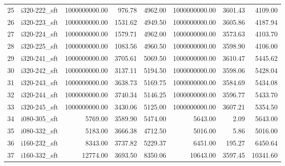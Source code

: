 \begin{tabular}{llrrrrrr}
25 &  i320-222\_sft &         1000000000.00 &                    976.78 &             4962.00 &      1000000000.00 &                3601.43 &          4109.00 \\
26 &  i320-223\_sft &         1000000000.00 &                   1531.62 &             4949.50 &      1000000000.00 &                3605.86 &          4187.94 \\
27 &  i320-224\_sft &         1000000000.00 &                   1579.71 &             4962.00 &      1000000000.00 &                3573.63 &          4103.70 \\
28 &  i320-225\_sft &         1000000000.00 &                   1083.56 &             4960.50 &      1000000000.00 &                3598.90 &          4106.00 \\
29 &  i320-241\_sft &         1000000000.00 &                   3705.61 &             5069.50 &      1000000000.00 &                3610.47 &          5445.62 \\
30 &  i320-242\_sft &         1000000000.00 &                   3137.11 &             5194.50 &      1000000000.00 &                3598.06 &          5428.04 \\
31 &  i320-243\_sft &         1000000000.00 &                   3638.73 &             5169.75 &      1000000000.00 &                3584.69 &          5434.08 \\
32 &  i320-244\_sft &         1000000000.00 &                   3740.34 &             5146.25 &      1000000000.00 &                3596.77 &          5433.70 \\
33 &  i320-245\_sft &         1000000000.00 &                   3430.06 &             5125.00 &      1000000000.00 &                3607.21 &          5354.50 \\
34 &  i080-305\_sft &               5769.00 &                   3589.90 &             5474.00 &            5643.00 &                   2.09 &          5643.00 \\
35 &  i080-332\_sft &               5183.00 &                   3666.38 &             4712.50 &            5016.00 &                   5.86 &          5016.00 \\
36 &  i160-232\_sft &               8343.00 &                   3737.82 &             5229.37 &            6451.00 &                 195.27 &          6450.64 \\
37 &  i160-332\_sft &              12774.00 &                   3693.50 &             8350.06 &           10643.00 &                3597.45 &         10341.60 \\

\end{tabular}
